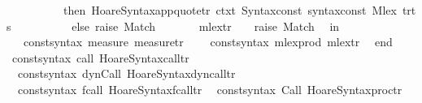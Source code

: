 \begin{isabellebody}
\ \ \ \ \ \ \ \ \ \ then\ Hoare{\isacharunderscore}Syntax{\isachardot}app{\isacharunderscore}quote{\isacharunderscore}tr{\isacharprime}\ ctxt\ {\isacharparenleft}Syntax{\isachardot}const\ {\isacharat}{\isacharbraceleft}syntax{\isacharunderscore}const\ {\isachardoublequote}{\isacharunderscore}Mlex{\isachardoublequote}{\isacharbraceright}{\isacharparenright}\ {\isacharparenleft}t{\isacharcolon}{\isacharcolon}r{\isacharcolon}{\isacharcolon}ts{\isacharparenright}\isanewline
\ \ \ \ \ \ \ \ \ \ else\ raise\ Match\isanewline
\ \ \ \ \ \ {\isacharbar}\ mlex{\isacharunderscore}tr{\isacharprime}\ {\isacharunderscore}\ {\isacharunderscore}\ {\isacharequal}\ raise\ Match\isanewline
\isanewline
\ \ in\isanewline
\ \ \ {\isacharbrackleft}{\isacharparenleft}{\isacharat}{\isacharbraceleft}const{\isacharunderscore}syntax\ measure{\isacharbraceright}{\isacharcomma}\ measure{\isacharunderscore}tr{\isacharprime}{\isacharparenright}{\isacharcomma}\isanewline
\ \ \ \ {\isacharparenleft}{\isacharat}{\isacharbraceleft}const{\isacharunderscore}syntax\ mlex{\isacharunderscore}prod{\isacharbraceright}{\isacharcomma}\ mlex{\isacharunderscore}tr{\isacharprime}{\isacharparenright}{\isacharbrackright}\isanewline
\ \ end\isanewline
{\isacartoucheclose}\isanewline
\isanewline
\isanewline
{}\isamarkupfalse%
\ {\isacartoucheopen}\isanewline
\ {\isacharbrackleft}{\isacharparenleft}{\isacharat}{\isacharbraceleft}const{\isacharunderscore}syntax\ call{\isacharbraceright}{\isacharcomma}\ Hoare{\isacharunderscore}Syntax{\isachardot}call{\isacharunderscore}tr{\isacharprime}{\isacharparenright}{\isacharcomma}\isanewline
\ \ {\isacharparenleft}{\isacharat}{\isacharbraceleft}const{\isacharunderscore}syntax\ dynCall{\isacharbraceright}{\isacharcomma}\ Hoare{\isacharunderscore}Syntax{\isachardot}dyn{\isacharunderscore}call{\isacharunderscore}tr{\isacharprime}{\isacharparenright}{\isacharcomma}\isanewline
\ \ {\isacharparenleft}{\isacharat}{\isacharbraceleft}const{\isacharunderscore}syntax\ fcall{\isacharbraceright}{\isacharcomma}\ Hoare{\isacharunderscore}Syntax{\isachardot}fcall{\isacharunderscore}tr{\isacharprime}{\isacharparenright}{\isacharcomma}\isanewline
\ \ {\isacharparenleft}{\isacharat}{\isacharbraceleft}const{\isacharunderscore}syntax\ Call{\isacharbraceright}{\isacharcomma}\ Hoare{\isacharunderscore}Syntax{\isachardot}proc{\isacharunderscore}tr{\isacharprime}{\isacharparenright}{\isacharbrackright}\isanewline
{\isacartoucheclose}%
\endisatagML
{\isafoldML}%
%
\isadelimML
\isanewline
%
\endisadelimML
%
\isadelimtheory
\isanewline
%
\endisadelimtheory
%
\isatagtheory
{}\isamarkupfalse%
%
\endisatagtheory
{\isafoldtheory}%
%
\isadelimtheory
%
\endisadelimtheory
%
\end{isabellebody}%

